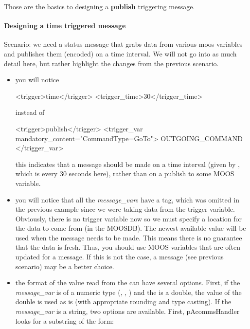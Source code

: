 Those are the basics to designing a \textbf{publish} triggering message.

\paragraph{Designing a time triggered message}
Scenario: we need a status message that grabs data from various moos variables and publishes them (encoded) on a time interval. We will not go into as much detail here, but rather highlight the changes from the previous scenario.
\begin{itemize}
\item you will notice
\begin{small}
\begin{boxedverbatim}
    <trigger>time</trigger>
    <trigger_time>30</trigger_time>
\end{boxedverbatim}
\resetbvlinenumber
\end{small}
instead of 
\begin{small}
\begin{boxedverbatim}
    <trigger>publish</trigger>
    <trigger_var mandatory_content="CommandType=GoTo"> 
      OUTGOING_COMMAND
    </trigger_var>
\end{boxedverbatim}
\resetbvlinenumber
\end{small}
this indicates that a message should be made on a time interval (given by , which is every 30 seconds here), rather than on a publish to some MOOS variable.
\item you will notice that all the \textit{message\_var}s have a  tag, which was omitted in the previous example since we were taking data from the trigger variable. Obviously, there is no trigger variable now so we must specify a location for the data to come from (in the MOOSDB). The newest available value will be used when the message needs to be made. This means there is no guarantee that the data is fresh. Thus, you should use MOOS variables that are often updated for a  message. If this is not the case, a  message (see previous scenario) may be a better choice.
\item the format of the value read from the  can have several options. First, if the \textit{message\_var} is of a numeric type (, , ) and the  is a double, the value of the double is used as is (with appropriate rounding and type casting). If the \textit{message\_var} is a string, two options are available. First, pAcommsHandler looks for a substring of the form:

\end{itemize}
